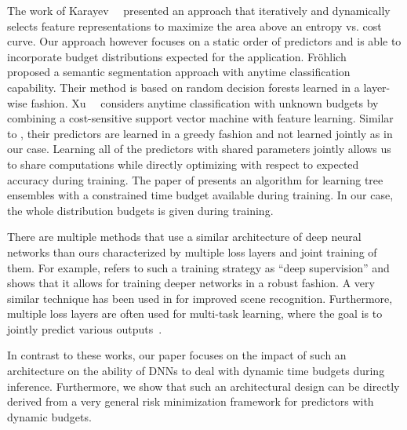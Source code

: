 \documentclass{bmvc2k}
\begin{document}
    The work of Karayev~\etal~\cite{karayev2014anytime} presented an approach that iteratively 
    and dynamically selects feature representations to maximize the area above an entropy vs. cost curve.
    Our approach however focuses on a static order of predictors and is able to incorporate
    budget distributions expected for the application.
    Fröhlich~\etal~\cite{Froehlich12:ATG} proposed a semantic segmentation approach
    with anytime classification capability. Their method is based on random decision forests
    learned in a layer-wise fashion. 
    Xu~\etal~\cite{xu2013anytime} considers anytime classification with unknown budgets by
    combining a cost-sensitive support vector machine with feature learning. 
    Similar to \cite{Froehlich12:ATG}, their predictors are learned in a greedy fashion and not learned jointly as in our case.
    Learning all of the predictors with shared parameters jointly allows us to share computations while
    directly optimizing with respect to expected accuracy during training.
    The paper of \cite{xu2012greedy} presents an algorithm for learning tree ensembles
    with a constrained time budget available during training. In our case, the whole distribution
    budgets is given during training.

    There are multiple methods that use a similar architecture of deep neural networks
    than ours characterized by multiple loss layers and joint training of them.
    For example, \cite{wang2015training} refers to such a training strategy as 
    ``deep supervision'' and shows that it allows for training deeper networks in a robust fashion.
    A very similar technique has been used in \cite{guo2016locally} for improved scene recognition.
    Furthermore, multiple loss layers are often used for multi-task learning, where the goal is
    to jointly predict various outputs~\cite{zhang2016learning}.
    
    
    In contrast to these works, our paper focuses on the impact of such an architecture
    on the ability of DNNs to deal with dynamic time budgets during inference. Furthermore,
    we show that such an architectural design can be directly derived from a very general
    risk minimization framework for predictors with dynamic budgets.

\end{document}

